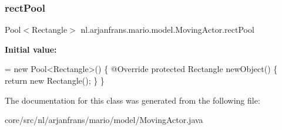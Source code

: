 \subsubsection{\texorpdfstring{rect\+Pool}{rectPool}}
{\footnotesize\ttfamily Pool$<$Rectangle$>$ nl.\+arjanfrans.\+mario.\+model.\+Moving\+Actor.\+rect\+Pool\hspace{0.3cm}{\ttfamily [protected]}}

{\bfseries Initial value\+:}
\begin{DoxyCode}
= \textcolor{keyword}{new} Pool<Rectangle>() \{
        @Override
        \textcolor{keyword}{protected} Rectangle newObject() \{
            \textcolor{keywordflow}{return} \textcolor{keyword}{new} Rectangle();
        \}
    \}
\end{DoxyCode}


The documentation for this class was generated from the following file\+:\begin{DoxyCompactItemize}
\item 
core/src/nl/arjanfrans/mario/model/Moving\+Actor.\+java\end{DoxyCompactItemize}
